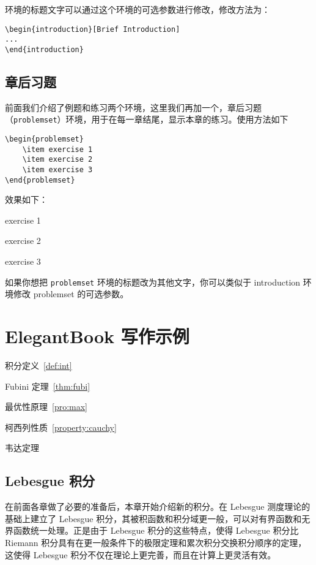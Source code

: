 \documentclass[cn,11pt]{elegantbook}
\begin{document}
环境的标题文字可以通过这个环境的可选参数进行修改，修改方法为：
\begin{lstlisting}
\begin{introduction}[Brief Introduction]
...
\end{introduction}
\end{lstlisting}


\section{章后习题}
前面我们介绍了例题和练习两个环境，这里我们再加一个，章后习题（\lstinline{problemset}）环境，用于在每一章结尾，显示本章的练习。使用方法如下

\begin{lstlisting}
\begin{problemset}
	\item exercise 1
	\item exercise 2
	\item exercise 3
\end{problemset}
\end{lstlisting}


效果如下：
\begin{problemset}
	\item exercise 1
	\item exercise 2
	\item exercise 3
\end{problemset}

\begin{remark}
如果你想把 \lstinline{problemset} 环境的标题改为其他文字，你可以类似于 introduction 环境修改 problemset 的可选参数。
\end{remark}

\chapter{ElegantBook 写作示例}

\begin{introduction}
\item 积分定义~\ref{def:int}
\item Fubini 定理~\ref{thm:fubi}
\item 最优性原理~\ref{pro:max}
\item 柯西列性质~\ref{property:cauchy}
\item 韦达定理
\end{introduction}

\section{Lebesgue 积分}
在前面各章做了必要的准备后，本章开始介绍新的积分。在 Lebesgue 测度理论的基础上建立了 Lebesgue 积分，其被积函数和积分域更一般，可以对有界函数和无界函数统一处理。正是由于 Lebesgue 积分的这些特点，使得 Lebesgue 积分比 Riemann 积分具有在更一般条件下的极限定理和累次积分交换积分顺序的定理，这使得 Lebesgue 积分不仅在理论上更完善，而且在计算上更灵活有效。
\end{document}
